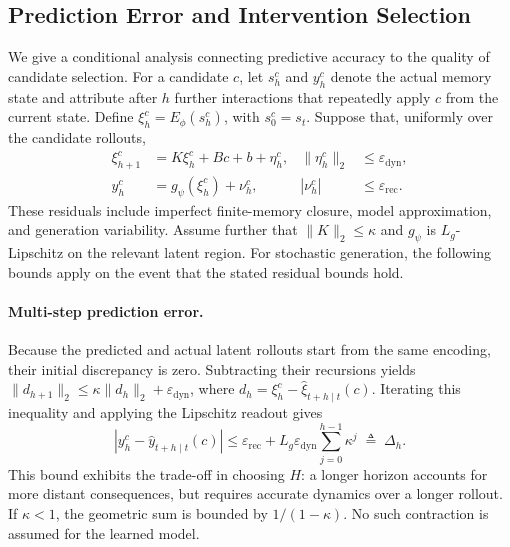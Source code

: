 \subsection{Prediction Error and Intervention Selection}
\label{sec:analysis}

We give a conditional analysis connecting predictive accuracy to the
quality of candidate selection. For a candidate $c$, let $s_h^c$ and
$y_h^c$ denote the actual memory state and attribute after $h$ further
interactions that repeatedly apply $c$ from the current state. Define
$\xi_h^c=E_{\phi}(s_h^c)$, with $s_0^c=s_t$. Suppose that, uniformly
over the candidate rollouts,
\begin{equation}
    \begin{aligned}
        \xi_{h+1}^c
        &=K\xi_h^c+Bc+b+\eta_h^c,
        &
        \|\eta_h^c\|_2
        &\leq\varepsilon_{\mathrm{dyn}},\\
        y_h^c
        &=g_{\psi}(\xi_h^c)+\nu_h^c,
        &
        |\nu_h^c|
        &\leq\varepsilon_{\mathrm{rec}}.
    \end{aligned}
    \label{eq:residual_assumptions}
\end{equation}
These residuals include imperfect finite-memory closure, model
approximation, and generation variability. Assume further that
$\|K\|_2\leq\kappa$ and $g_{\psi}$ is $L_g$-Lipschitz on the relevant
latent region. For stochastic generation, the following bounds apply
on the event that the stated residual bounds hold.

\paragraph{Multi-step prediction error.}

Because the predicted and actual latent rollouts start from the same
encoding, their initial discrepancy is zero. Subtracting their
recursions yields
$\|d_{h+1}\|_2
\leq\kappa\|d_h\|_2+\varepsilon_{\mathrm{dyn}}$,
where
$d_h=\xi_h^c-\widehat{\xi}_{t+h\mid t}(c)$.
Iterating this inequality and applying the Lipschitz readout gives
\begin{equation}
    \left|
        y_h^c-\widehat{y}_{t+h\mid t}(c)
    \right|
    \leq
    \varepsilon_{\mathrm{rec}}
    +
    L_g\varepsilon_{\mathrm{dyn}}
    \sum_{j=0}^{h-1}\kappa^j
    \;\triangleq\;\Delta_h.
    \label{eq:prediction_bound}
\end{equation}
This bound exhibits the trade-off in choosing $H$: a longer horizon
accounts for more distant consequences, but requires accurate dynamics
over a longer rollout. If $\kappa<1$, the geometric sum is bounded by
$1/(1-\kappa)$. No such contraction is assumed for the learned model.

